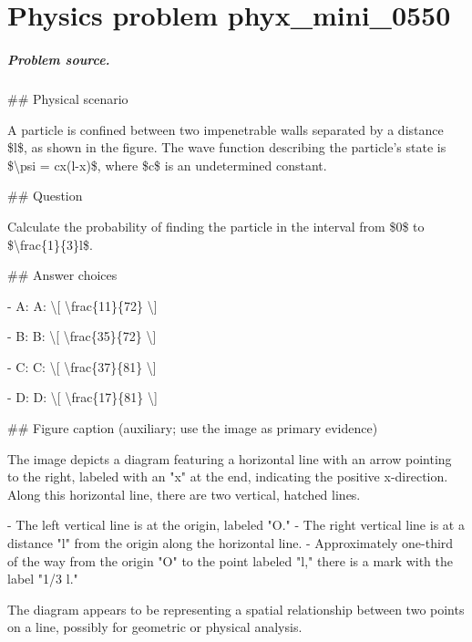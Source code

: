 
\chapter{Physics problem phyx\_mini\_0550}
\label{ch:PhyXMiniProblems_problem_phyx_mini_0550}

\paragraph{Problem source.}
\#\# Physical scenario

A particle is confined between two impenetrable walls separated by a distance \$l\$, as shown in the figure. The wave function describing the particle's state is \$\textbackslash{}psi = cx(l-x)\$, where \$c\$ is an undetermined constant.

\#\# Question

Calculate the probability of finding the particle in the interval from \$0\$ to \$\textbackslash{}frac\{1\}\{3\}l\$.

\#\# Answer choices

- A: A: \textbackslash{}[ \textbackslash{}frac\{11\}\{72\} \textbackslash{}]

- B: B: \textbackslash{}[ \textbackslash{}frac\{35\}\{72\} \textbackslash{}]

- C: C: \textbackslash{}[ \textbackslash{}frac\{37\}\{81\} \textbackslash{}]

- D: D: \textbackslash{}[ \textbackslash{}frac\{17\}\{81\} \textbackslash{}]

\#\# Figure caption (auxiliary; use the image as primary evidence)

The image depicts a diagram featuring a horizontal line with an arrow pointing to the right, labeled with an "x" at the end, indicating the positive x-direction. Along this horizontal line, there are two vertical, hatched lines.

- The left vertical line is at the origin, labeled "O."
- The right vertical line is at a distance "l" from the origin along the horizontal line.
- Approximately one-third of the way from the origin "O" to the point labeled "l," there is a mark with the label "1/3 l."

The diagram appears to be representing a spatial relationship between two points on a line, possibly for geometric or physical analysis.

